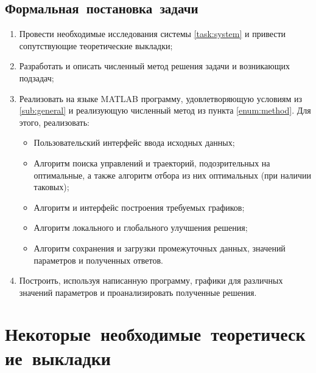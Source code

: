 \documentclass[11pt, oneside, final]{article}
\theoremstyle{break}
\numberwithin{equation}{section}
\theoremstyle{plain}
\theoremstyle{definition}
\begin{document}
    \subsection{Формальная~постановка~задачи} 
    \label{sub:formal}
    \begin{enumerate}
        \item Провести необходимые исследования системы \eqref{task:system} и привести сопутствующие теоретические выкладки;
        \item \label{enum:method} Разработать и описать численный метод решения задачи и возникающих подзадач;
        \item Реализовать на языке MATLAB программу, удовлетворяющую условиям из \ref{sub:general} и реализующую численный метод из пункта \ref{enum:method}.
        Для этого, реализовать:
        \begin{itemize}
            \item  Пользовательский интерфейс ввода исходных данных;
            \item  Алгоритм поиска управлений и траекторий, подозрительных на оптимальные, а также алгоритм отбора из них оптимальных (при наличии таковых);
            \item  Алгоритм и интерфейс построения требуемых графиков;
            \item  Алгоритм локального и глобального улучшения решения; 
            \item  Алгоритм сохранения и загрузки промежуточных данных, значений параметров и полученных ответов.
        \end{itemize}
        \item Построить, используя написанную программу, графики для различных значений параметров и проанализировать полученные решения.
    \end{enumerate}
    \pagebreak
    \section{Некоторые~необходимые~теоретические~выкладки}
    \label{sec:theory}
\end{document}

